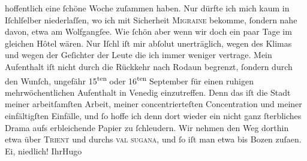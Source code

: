 \begin{ledgroupsized}[t]{13cm}
               hoffentlich eine ſchöne Woche zuſammen haben. Nur dürfte ich mich kaum in Iſchlſelber niederlaſſen, wo ich mit Sicherheit \textsc{Migraine} bekomme, ſondern nahe davon, etwa am Wolfgangſee. Wie ſchön {\pb}aber wenn wir doch ein paar Tage
               im gleichen Hôtel wären. Nur Iſchl iſt mir
               abſolut unerträglich, wegen des Klimas und wegen der Geſichter der Leute die ich
               immer weniger vertrage.\pend
           \pstart
           Mein Aufenthalt iſt nicht durch die Rückkehr nach Rodaun begrenzt, ſondern durch den Wunſch, ungefähr {\pb}15\textsuperscript{ten} oder 16\textsuperscript{ten} September für einen
               ruhigen mehrwöchentlichen Aufenthalt in Venedig
               einzutreffen. Denn das iſt die Stadt meiner arbeitſamſten Arbeit, meiner
               concentrierteſten Concentration und meiner einfältigſten Einfälle, und ſo hoffe ich
               denn dort wieder ein nicht ganz ſterbliches Drama aufs erbleichende Papier zu ſchleudern. Wir nehmen den
               Weg dorthin etwa über \textsc{Trient} und durchs \textsc{val sugana}, und ſo iſt man etwa bis Bozen zuſa{\geminationm}en. Ei, niedlich!\pend
           \pstart Ihr\spacefill\mbox{Hugo}\pend{}
         
         \endnumbering{}\end{ledgroupsized}  \newcommand{\dateiname}{L01431}\newcommand{\titel}{Hugo von Hofmannsthal an Arthur Schnitzler, 21. 8. [1904]}\newcommand{\editorInnen}{Martin Anton Müller und Gerd-Hermann Susen}
      